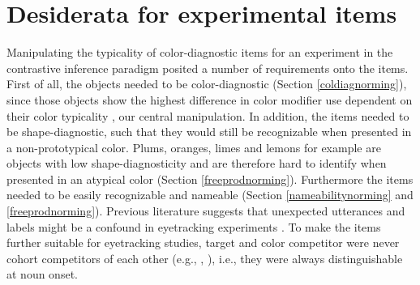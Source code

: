 \documentclass[a4paper,man,floatsintext,natbib,donotrepeattitle]{apa6}
\begin{document}

\section{Desiderata for experimental items}


Manipulating the typicality of color-diagnostic items for an experiment in the contrastive inference paradigm posited a number of requirements onto the items. 
First of all, the objects needed to be color-diagnostic (Section \ref{coldiagnorming}), since those objects show the highest difference in color modifier use dependent on their color typicality \citep{Westerbeek:2015,Tanaka:1999,Sedivy:2003}, our central manipulation. In addition, the items needed to be shape-diagnostic, such that they would still be recognizable when presented in a non-prototypical color. Plums, oranges, limes and lemons for example are objects with low shape-diagnosticity and are therefore hard to identify when presented in an atypical color (Section \ref{freeprodnorming}). Furthermore the items needed to be easily recognizable and nameable (Section \ref{nameabilitynorming} and \ref{freeprodnorming}). Previous literature suggests that unexpected utterances and labels might be a confound in eyetracking experiments \citep{Qing:2018}. To make the items further suitable for eyetracking studies, target and color competitor were never cohort competitors of each other (e.g., \cite{Cole:1980}, \cite{Marslen-Wilson:1984}), i.e., they were always distinguishable at noun onset.
\end{document}
